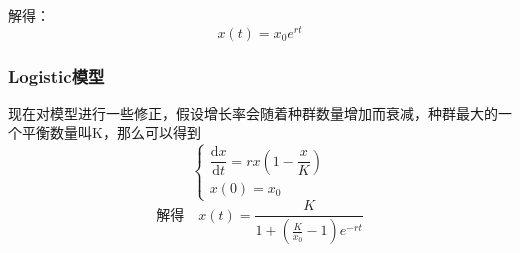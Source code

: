 \documentclass[12pt,a4paper]{article}
\begin{document}
解得：
$$
x(t) = x_0 e^{rt}
$$

\subsubsection{Logistic模型}
现在对模型进行一些修正，假设增长率会随着种群数量增加而衰减，种群最大的一个平衡数量叫K，那么可以得到
$$
\begin{cases}
    \dfrac{\textrm{d} x}{\textrm{d} t} = rx(1 - \dfrac{x}{K}) \\
    x(0) = x_0
\end{cases}
$$
$$
\text{解得}
\quad 
x(t) = \dfrac{K}{1+\left ( \frac{K}{x_0} - 1 \right ) e^{-rt}}
$$
\end{document}
